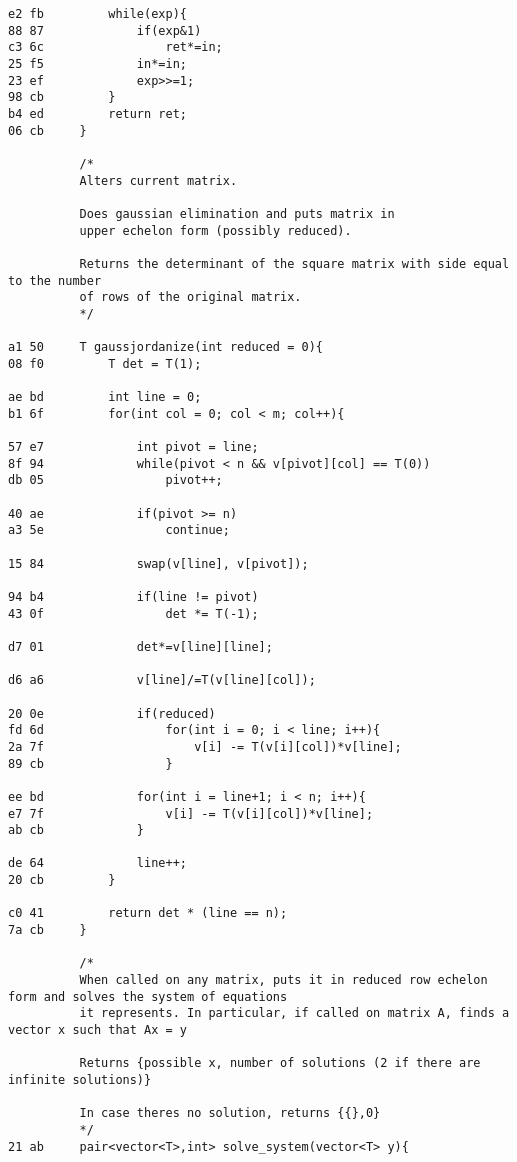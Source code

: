 \documentclass[11pt, a4paper, twoside]{article}
\begin{document}
\begin{lstlisting}
e2 fb         while(exp){
88 87             if(exp&1)
c3 6c                 ret*=in;
25 f5             in*=in;
23 ef             exp>>=1;
98 cb         }
b4 ed         return ret;
06 cb     }
      
          /*
          Alters current matrix.
      
          Does gaussian elimination and puts matrix in
          upper echelon form (possibly reduced).
      
          Returns the determinant of the square matrix with side equal to the number
          of rows of the original matrix.
          */
      
a1 50     T gaussjordanize(int reduced = 0){
08 f0         T det = T(1);
      
ae bd         int line = 0;
b1 6f         for(int col = 0; col < m; col++){
      
57 e7             int pivot = line;
8f 94             while(pivot < n && v[pivot][col] == T(0))
db 05                 pivot++;
                  
40 ae             if(pivot >= n)
a3 5e                 continue;
      
15 84             swap(v[line], v[pivot]);
      
94 b4             if(line != pivot)
43 0f                 det *= T(-1);
              
d7 01             det*=v[line][line];
                  
d6 a6             v[line]/=T(v[line][col]);
      
20 0e             if(reduced)
fd 6d                 for(int i = 0; i < line; i++){
2a 7f                     v[i] -= T(v[i][col])*v[line];
89 cb                 }
                  
ee bd             for(int i = line+1; i < n; i++){
e7 7f                 v[i] -= T(v[i][col])*v[line];
ab cb             }
      
de 64             line++;
20 cb         }
      
c0 41         return det * (line == n);
7a cb     }
      
          /*
          When called on any matrix, puts it in reduced row echelon form and solves the system of equations
          it represents. In particular, if called on matrix A, finds a vector x such that Ax = y
      
          Returns {possible x, number of solutions (2 if there are infinite solutions)}
      
          In case theres no solution, returns {{},0}
          */ 
21 ab     pair<vector<T>,int> solve_system(vector<T> y){
              

\end{lstlisting}
\end{document}

